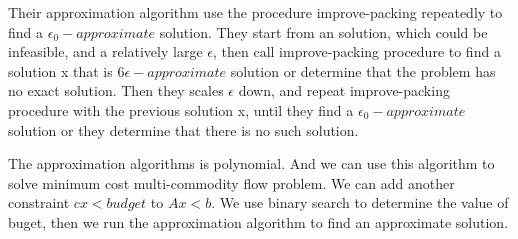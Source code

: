 \documentclass[a4paper]{article}
\begin{document}
Their approximation algorithm use the procedure improve-packing repeatedly to find a $\epsilon_0-approximate$ solution. They start from an solution, which could be infeasible, and a relatively large $\epsilon$, then call improve-packing procedure to find a solution x
that is $6\epsilon-approximate$ solution or determine that the problem has no exact solution. Then they scales $\epsilon$ down, and repeat improve-packing procedure with the previous solution x, until they find a $\epsilon_0-approximate$ solution or they determine that there is no such solution.

The approximation algorithms is polynomial. And we can use this algorithm to solve minimum cost multi-commodity flow problem. We can add another constraint $cx<budget$ to $Ax<b$. We use binary search to determine the value of buget, then we run the approximation algorithm to find an approximate solution.








\end{document}
